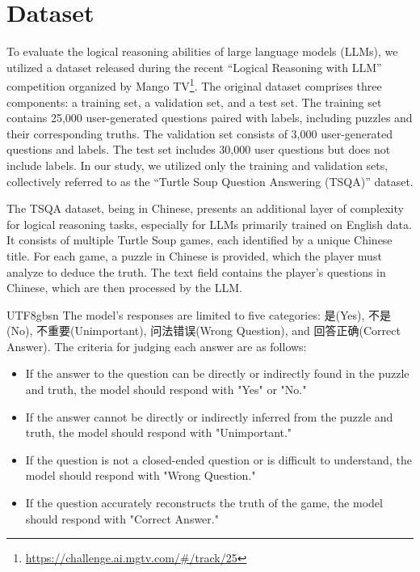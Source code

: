\section{Dataset}

To evaluate the logical reasoning abilities of large language models (LLMs), we utilized a dataset released during the recent “Logical Reasoning with LLM” competition organized by Mango TV\footnote{\url{https://challenge.ai.mgtv.com/#/track/25}}. The original dataset comprises three components: a training set, a validation set, and a test set. The training set contains 25,000 user-generated questions paired with labels, including puzzles and their corresponding truths. The validation set consists of 3,000 user-generated questions and labels. The test set includes 30,000 user questions but does not include labels. In our study, we utilized only the training and validation sets, collectively referred to as the “Turtle Soup Question Answering (TSQA)” dataset.

The TSQA dataset, being in Chinese, presents an additional layer of complexity for logical reasoning tasks, especially for LLMs primarily trained on English data. It consists of multiple Turtle Soup games, each identified by a unique Chinese title. For each game, a puzzle in Chinese is provided, which the player must analyze to deduce the truth. The text field contains the player's questions in Chinese, which are then processed by the LLM.

\begin{CJK*}{UTF8}{gbsn}
The model's responses are limited to five categories: 是(Yes), 不是(No), 不重要(Unimportant), 问法错误(Wrong Question), and 回答正确(Correct Answer). The criteria for judging each answer are as follows:
\end{CJK*}
\begin{itemize}
    \item If the answer to the question can be directly or indirectly found in the puzzle and truth, the model should respond with "Yes" or "No."
    \item If the answer cannot be directly or indirectly inferred from the puzzle and truth, the model should respond with "Unimportant."
    \item If the question is not a closed-ended question or is difficult to understand, the model should respond with "Wrong Question."
    \item If the question accurately reconstructs the truth of the game, the model should respond with "Correct Answer."
\end{itemize}

